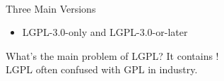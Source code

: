 \begin{frame}{\insertsubsection\ }
\begin{fancycolumns}
\begin{note}{Three Main Versions}
\begin{itemize}
				\item LGPL-3.0-only and LGPL-3.0-or-later
			\end{itemize}
		\end{note}
		\begin{example}{What's the main problem of LGPL?}
			\centering It contains !\\[2mm]LGPL often confused with GPL in industry.
		\end{example}
	\end{fancycolumns}
\end{frame}


